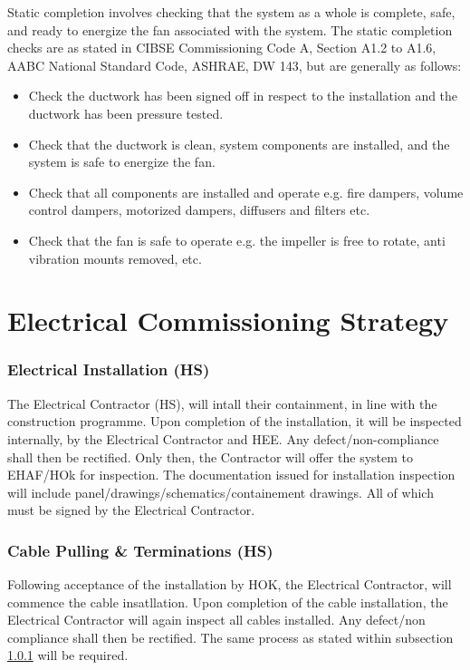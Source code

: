 Static completion involves checking that the system as a whole is complete, safe, and ready to energize the fan associated with the system. The static completion checks are as stated in CIBSE Commissioning Code A, Section A1.2 to A1.6, AABC National Standard Code, ASHRAE, DW 143, but are generally as follows:

\begin{itemize}
\item 	Check the ductwork has been signed off in respect to the installation and the ductwork has been pressure tested.
\item 	Check that the ductwork is clean, system components are installed, and the system is safe to energize the fan.
\item 	Check that all components are installed and operate e.g. fire dampers, volume control dampers, motorized dampers, diffusers and filters etc.
\item	Check that the fan is safe to operate e.g. the impeller is free to rotate, anti vibration mounts removed, etc.
\end{itemize}




\chapter{Electrical Commissioning Strategy}

\subsection{Electrical Installation (HS)}
\label{sub:electrical}
The Electrical Contractor (HS), will intall their containment, in line with the construction programme. Upon completion of the installation, it will be inspected internally, by the Electrical Contractor and HEE. Any defect/non-compliance shall then be rectified. Only then, the Contractor will offer the system to EHAF/HOk for inspection. The documentation issued for installation inspection will include panel/drawings/schematics/containement drawings. All of which must be signed by the Electrical Contractor.

\subsection{Cable Pulling \& Terminations (HS)}

Following acceptance of the installation by HOK, the Electrical Contractor, will commence the cable insatllation. Upon completion of the cable installation, the Electrical Contractor will again inspect all cables installed. Any defect/non compliance shall then be rectified. The same process as stated within subsection \ref{sub:electrical} will be required.

